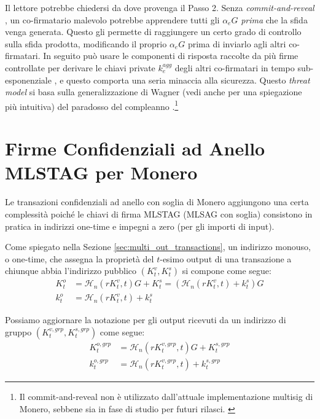 Il lettore potrebbe chiedersi da dove provenga il Passo 2. Senza \emph{commit-and-reveal} \cite{MRL-0009-multisig}, un co-firmatario malevolo potrebbe apprendere tutti gli $\alpha_e G$ \emph{prima} che la sfida venga generata. Questo gli permette di raggiungere un certo grado di controllo sulla sfida prodotta, modificando il proprio $\alpha_e G$ prima di inviarlo agli altri co-firmatari. In seguito può usare le componenti di risposta raccolte da più firme controllate per derivare le chiavi private $k^{agg}_e$ degli altri co-firmatari in tempo sub-esponenziale \cite{cryptoeprint:2018:417}, e questo comporta una seria minaccia alla sicurezza. Questo \emph{threat model} si basa sulla generalizzazione di Wagner \cite{generalized-birthday-wagner} (vedi anche \cite{adam-wagnerian-tragedies} per una spiegazione più intuitiva) del paradosso del compleanno \cite{birthday-problem}.\footnote{Il commit-and-reveal non è utilizzato dall'attuale implementazione multisig di Monero, sebbene sia in fase di studio per futuri rilasci. \cite{multisig-research-issue-67}}



\section{Firme Confidenziali ad Anello MLSTAG per Monero}
\label{sec:MLSTAG-RingCT}

Le transazioni confidenziali ad anello con soglia di Monero aggiungono una certa complessità poiché le chiavi di firma MLSTAG (MLSAG con soglia) consistono in pratica in indirizzi one-time e impegni a zero (per gli importi di input).

Come spiegato nella Sezione \ref{sec:multi_out_transactions}, un indirizzo monouso, o one-time, che assegna la proprietà del $t$-esimo output di una transazione a chiunque abbia l'indirizzo pubblico $(K^v_t,K^s_t)$ si compone come segue:\vspace{.175cm}
\begin{align*}
  K_t^o &= \mathcal{H}_n(r K_t^v, t)G + K_t^s = (\mathcal{H}_n(r K_t^v, t) + k_t^s)G  \\
  k_t^o &= \mathcal{H}_n(r K_t^v, t) + k_t^s
\end{align*}

Possiamo aggiornare la notazione per gli output ricevuti da un indirizzo di gruppo $(K^{v,grp}_t,K^{s,grp}_t)$ come segue:\vspace{.175cm}
\begin{align*}
  K^{o,grp}_t &= \mathcal{H}_n(r K^{v,grp}_t, t)G + K^{s,grp}_t  \\
  k^{o,grp}_t &= \mathcal{H}_n(r K^{v,grp}_t, t) + k^{s,grp}_t
\end{align*}

